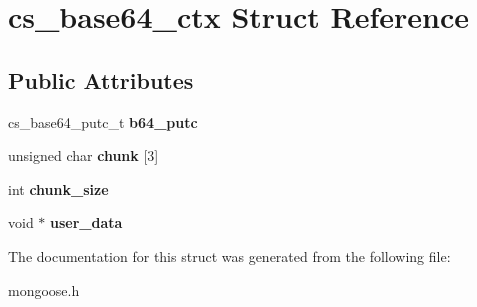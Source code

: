 \hypertarget{structcs__base64__ctx}{}\section{cs\+\_\+base64\+\_\+ctx Struct Reference}
\label{structcs__base64__ctx}
\subsection*{Public Attributes}
\begin{DoxyCompactItemize}
\item 
\mbox{\label{structcs__base64__ctx_a59b8384fbdd1681555a9dd18ed6585ae}} 
cs\+\_\+base64\+\_\+putc\+\_\+t {\bfseries b64\+\_\+putc}
\item 
\mbox{\label{structcs__base64__ctx_a209b5eff716d6a1850cca128ed5b070e}} 
unsigned char {\bfseries chunk} \mbox{[}3\mbox{]}
\item 
\mbox{\label{structcs__base64__ctx_a5753baf57fe83161369e2270d57e4a9e}} 
int {\bfseries chunk\+\_\+size}
\item 
\mbox{\label{structcs__base64__ctx_ac6023cc2887001835a99b6a71db9f43b}} 
void $\ast$ {\bfseries user\+\_\+data}
\end{DoxyCompactItemize}


The documentation for this struct was generated from the following file\+:\begin{DoxyCompactItemize}
\item 
mongoose.\+h\end{DoxyCompactItemize}
